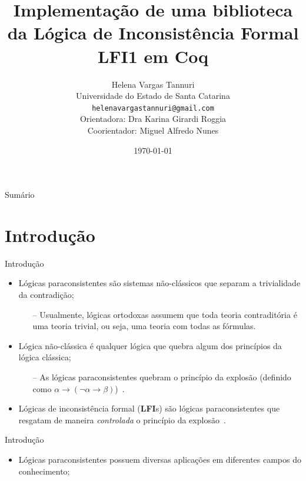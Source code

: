 \documentclass[xcolor=table]{beamer}
\title[]{Implementação de uma biblioteca da Lógica de Inconsistência Formal LFI1 em Coq}
\author[Helena Vargas Tannuri]{
    Helena Vargas Tannuri\\\smallskip
    {\scriptsize Universidade do Estado de Santa Catarina \\\smallskip
    \vspace{-2mm}
    \texttt{helenavargastannuri@gmail.com}\\\medskip
    {Orientadora: Dra Karina Girardi Roggia}\\
    {Coorientador: Miguel Alfredo Nunes}
    }
}
\date[]{\today}
\begin{document}
    \begin{frame}
        \titlepage
    \end{frame}

    \begin{frame}[allowframebreaks]{Sumário}
        \tableofcontents
    \end{frame}

    \section[]{Introdução}
    \begin{frame}{Introdução}
        \begin{itemize}
            \item Lógicas paraconsistentes são sistemas não-clássicos que separam a trivialidade da contradição;
            \begin{itemize}
                \item[--] Usualmente, lógicas ortodoxas assumem que toda teoria contraditória é uma teoria trivial, ou seja, uma teoria com todas as fórmulas.
            \end{itemize}
            \item Lógica não-clássica é qualquer lógica que quebra algum dos princípios da lógica clássica;
            \begin{itemize}
                \item[--] As lógicas paraconsistentes quebram o princípio da explosão (definido como $\alpha \to (\neg \alpha \to \beta)$)~\cite{carnielli2007}.
            \end{itemize}
            \item Lógicas de inconsistência formal (\textbf{LFI}s) são lógicas paraconsistentes que resgatam de maneira \textit{controlada} o princípio da explosão~\cite{Carnielli_Coniglio_2016}.
        \end{itemize}
    \end{frame}

    \begin{frame}{Introdução}
        \begin{itemize}
            \item Lógicas paraconsistentes possuem diversas aplicações em diferentes campos do conhecimento;
        \end{itemize}
    \end{frame}
\end{document}
